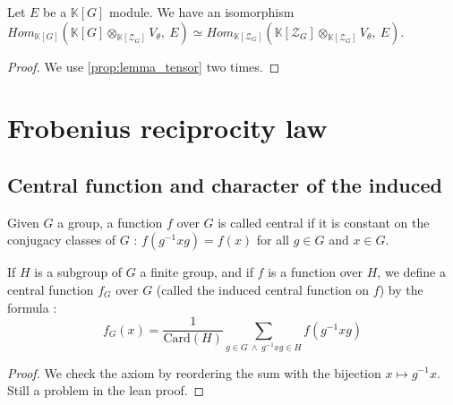 \begin{proposition}
    \label{prop:induced_property}
    \leanok 
    Let $E$ be a $\mathbb{K}[G]$ module. We have an isomorphism $Hom_{\mathbb{K}[G]}
    \left(\mathbb{K}[G]\otimes_{\mathbb{K}[\mathcal{Z}_G]}V_\theta,\ E\right)\simeq Hom_{\mathbb{K}[\mathcal{Z}_G]}
    \left(\mathbb{K}[\mathcal{Z}_G]\otimes_{\mathbb{K}[\mathcal{Z}_G]}V_\theta,\ E\right)$.
\end{proposition}
\begin{proof}
    \leanok
    We use \ref{prop:lemma_tensor} two times.
\end{proof}


\section{Frobenius reciprocity law}

\subsection{Central function and character of the induced}

\begin{definition}
    \label{def:central_fun}
    \uses{}
    \leanok 
    Given $G$ a group, a function $f$ over $G$ is called central if it is constant on
    the conjugacy classes of $G$ : $f(g^{-1}xg)=f(x)$ for all $g\in G$ and $x\in G$.
\end{definition}

\begin{definition}
    \label{def:induced_central_fun}
    \leanok 
    If $H$ is a subgroup of $G$ a finite group, and if $f$ is a function over $H$, we define a central function 
    $f_G$ over $G$ (called the induced central function on $f$) by the formula :
    \begin{equation*}
        f_G(x)=\frac{1}{\text{Card}(H)}\sum\limits_{g\in G\ \wedge\ g^{-1}xg\in H}f(g^{-1}xg)
    \end{equation*}
\begin{proof} 
    \leanok
    We check the axiom by reordering the sum with the bijection $x\mapsto g^{-1}x$.
    Still a problem in the lean proof.
\end{proof}
\end{definition}

